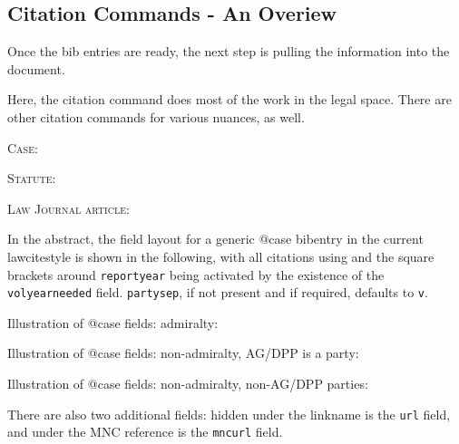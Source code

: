 \subsection{Citation Commands - An Overiew}
{\renewcommand{\qqcitecasewidth}{0.68}
}

\bigskip
Once the bib entries are ready, the next step is pulling the information into the document.

Here, the  citation command does most of the work in the legal space. There are other citation commands for various nuances, as well.

\bigskip
\textsc{Case}:

\textsc{Statute}:

\textsc{Law Journal article}:

In the abstract, the field layout for a generic @case bibentry in the current lawcitestyle is shown in the following, with all citations using  and the square brackets around \texttt{reportyear} being activated by the existence of the \texttt{volyearneeded} field. \texttt{partysep}, if not present and if required, defaults to \texttt{v}.

Illustration of @case fields: admiralty:

Illustration of @case fields: non-admiralty, AG/DPP is a party:


Illustration of @case fields: non-admiralty, non-AG/DPP parties:

There are also two additional fields: hidden under the linkname is the \texttt{url} field, and under the MNC reference is the \texttt{mncurl} field.

